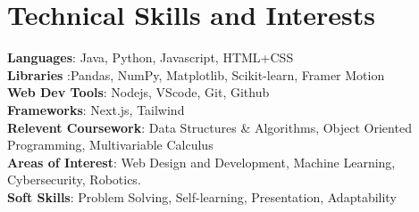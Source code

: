 \documentclass[a4paper,11pt]{article}
\begin{document}
\section{\textbf{Technical Skills and Interests}}
 \begin{itemize}[leftmargin=0.05in, label={}]
    \small{\item{
     \textbf{Languages}{: Java, Python, Javascript, HTML+CSS } \\
     \textbf{Libraries }{:Pandas, NumPy, Matplotlib, Scikit-learn, Framer Motion }\\ 
     \textbf{Web Dev Tools}{: Nodejs, VScode, Git, Github } \\ 
     \textbf{Frameworks}{: Next.js, Tailwind } \\  
      \textbf{Relevent Coursework}{: Data Structures \& Algorithms, Object Oriented Programming, Multivariable Calculus } \\ 
     \textbf{Areas of Interest}{: Web Design and Development, Machine Learning, Cybersecurity, Robotics.} \\
     \textbf{Soft Skills}{: Problem Solving, Self-learning, Presentation, Adaptability} \\
    }}
 \end{itemize}
 \vspace{-16pt}
\end{document}

